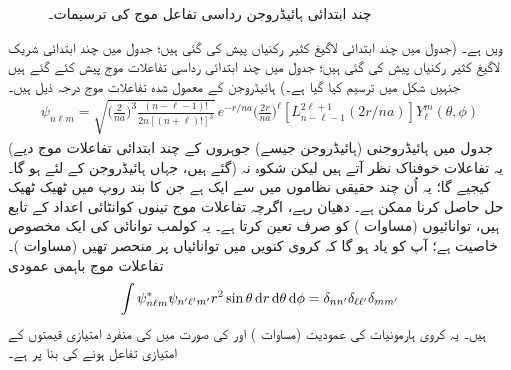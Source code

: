 \begin{figure}
\centering
{}
\caption{چند ابتدائی ہائیڈروجن رداسی تفاعل موج  کی ترسیمات۔}
\label{شکل_تین_ابعادی_چند_رداسی_تفاعل_موج_ہائیڈروجن}
\end{figure}

  ویں  ہے۔ (جدول  میں چند ابتدائی لاگیغ کثیر رکنیاں پیش کی گئی ہیں؛ جدول  میں چند ابتدائی شریک لاگیغ کثیر رکنیاں پیش کی گئی ہیں؛ جدول  میں چند ابتدائی رداسی تفاعلات موج پیش کئے گئے ہیں جنہیں شکل  میں ترسیم کیا گیا ہے۔) ہائیڈروجن کے معمول شدہ تفاعلات موج درجہ ذیل ہیں۔
 \begin{align}\label{مساوات_تین_ابعادی_ہائیڈروجن_تفاعلات_موج}
\psi_{n\ell m}=\sqrt{\big(\frac{2}{na}\big)^3\frac{(n-\ell-1)!}{2n[(n+\ell)!]^{3}}}\,e^{-r/na}\big(\frac{2r}{na}\big)^{\ell}[L_{n-\ell-1}^{2\ell+1}(2r/na)]Y_{\ell}^{m}(\theta,\phi)
\end{align}
 (جدول  میں ہائیڈروجنی (ہائیڈروجن جیسے)  جوہروں کے  چند ابتدائی  تفاعلات موج دیے گئے ہیں،  جہاں ہائیڈروجن کے لئے  ہو گا۔) یہ تفاعلات خوفناک نظر آتے ہیں لیکن شکوہ نہ کیجیے گا؛ یہ اُن چند حقیقی نظاموں میں سے ایک ہے جن کا بند روپ میں ٹھیک ٹھیک حل حاصل کرنا ممکن ہے۔ دھیان رہے، اگرچہ تفاعلات موج تینوں کوانٹائی اعداد کے تابع ہیں، توانائیوں (مساوات ) کو صرف  تعین کرتا ہے۔ یہ کولمب توانائی کی ایک مخصوص خاصیت ہے؛ آپ کو یاد ہو گا کہ کروی کنویں میں توانائیاں  پر منحصر تھیں (مساوات )۔ تفاعلات موج باہمی عمودی 
\begin{align}
\int\psi_{n\ell m}^{*}\psi_{n'\ell'm'}r^{2}\sin\theta\dif r\dif\theta\dif\phi=\delta_{nn'}\delta_{\ell \ell'}\delta_{mm'} 
\end{align}
ہیں۔ یہ کروی ہارمونیات کی عمودیت (مساوات ) اور  کی صورت میں  کی منفرد امتیازی قیمتوں  کے امتیازی تفاعل ہونے کی بنا پر ہے۔

